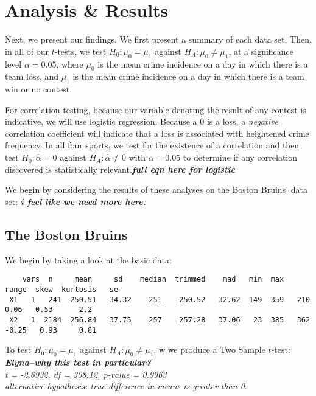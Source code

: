\documentclass{article}
\begin{document}
\section{Analysis \& Results}
Next, we present our findings. We first present a summary of each data set. Then, in all of our $t$-tests, we test $H_0: \mu_0 = \mu_1$ against $H_A: \mu_0 \neq \mu_1$, at a significance level $\alpha = 0.05$, where $\mu_0$ is the mean crime incidence on a day in which there is a team loss, and $\mu_1$ is the mean crime incidence on a day in which there is a team win or no contest. \newline

For correlation testing, because our variable denoting the result of any contest is indicative, we will use logistic regression. Because a $0$ is a loss, a \textit{negative} correlation coefficient will indicate that a loss is associated with heightened crime frequency. In all four sports, we test for the existence of a correlation and then test $H_0: \hat{\alpha} = 0$ against $H_A: \hat{\alpha} \neq 0$ with $\alpha = 0.05$ to determine if any correlation discovered is statistically relevant.\textbf{\textit{full eqn here for logistic}} \newline 

We begin by considering the results of these analyses on the Boston Bruins' data set: \textbf{\textit{i feel like we need more here.}} \
\subsection{The Boston Bruins}
We begin by taking a look at the basic data: 

\begin{verbatim}
    vars  n     mean     sd    median  trimmed    mad   min  max  range  skew  kurtosis   se
 X1   1   241  250.51   34.32    251    250.52   32.62  149  359   210   0.06   0.53      2.2
 X2   1  2184  256.84   37.75    257    257.28   37.06   23  385   362  -0.25   0.93     0.81
\end{verbatim}

To test $H_0: \mu_0 = \mu_1$ against $H_A: \mu_0 \neq \mu_1$, w we produce a Two Sample $t$-test: \textit{\textbf{Elyna--why this test in particular?}}\\

\textit{
t = -2.6932, df = 308.12, p-value = 0.9963\\
alternative hypothesis: true difference in means is greater than 0}. \\
\end{document}

